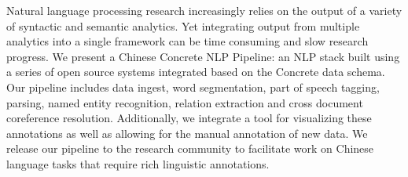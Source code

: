 Natural language processing research increasingly relies on the output of a variety of syntactic and semantic analytics. Yet integrating output from multiple analytics into a single framework can be time consuming and slow research progress. We present a Chinese Concrete NLP Pipeline: an NLP stack built using a series of open source systems integrated based on the Concrete data schema.  Our pipeline includes data ingest, word segmentation, part of speech tagging, parsing, named entity recognition, relation extraction and cross document coreference resolution. Additionally, we integrate a tool for visualizing these annotations as well as allowing for the manual annotation of new data. We release our pipeline to the research community to facilitate work on Chinese language tasks that require rich linguistic annotations.
